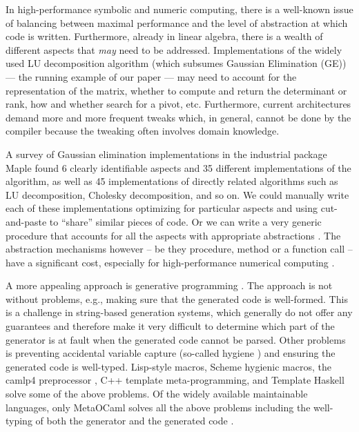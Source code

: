 \documentclass[draft]{elsart}
\begin{document}
In high-performance symbolic and numeric computing, there is a
well-known issue of balancing between maximal performance and the
level of abstraction at which code is written.  Furthermore, already
in linear algebra, there is a wealth of different aspects that
\emph{may} need to be addressed. Implementations of the
widely used LU decomposition algorithm (which subsumes Gaussian 
Elimination (GE)) --- the running
example of our paper --- may need to account for the representation of
the matrix, whether to compute and return the determinant or rank, how
and whether search for a pivot, etc. Furthermore, current architectures
demand more and more frequent tweaks which, in general, cannot be done by the
compiler because the tweaking often involves domain knowledge. 

A survey \cite{Carette06} of
Gaussian elimination implementations in the industrial package Maple
found 6 clearly identifiable aspects and 35 different implementations of the
algorithm, as well as 45 implementations of directly related algorithms such as
LU decomposition, Cholesky decomposition, and so on.  We could
manually write each of these implementations optimizing for particular aspects
and using cut-and-paste to ``share'' similar pieces of code.
Or we can write a very generic procedure that accounts for
all the aspects with appropriate abstractions \cite{Axiom}. The
abstraction mechanisms however -- be they procedure, method or a
function call -- have a significant cost, especially for
high-performance numerical computing \cite{Carette06}. 

A more appealing approach is generative programming
\cite{Czarnecki,Veldhuizen:1998:ISCOPE,musser89generic,musser94algorithmoriented,BOOST,POOMA,ATLAS}.
The approach is not without problems, e.g., making sure that the
generated code is well-formed. This is a challenge in string-based
generation systems, which generally do not offer any guarantees and
therefore make it very difficult to determine which part of the
generator is at fault when the generated code cannot be parsed. Other
problems is preventing accidental variable capture (so-called hygiene
\cite{HygienicMacros}) and ensuring the generated code is
well-typed. Lisp-style macros, Scheme hygienic macros, the camlp4
preprocessor \cite{camlp4}, C++ template meta-programming, and Template
Haskell \cite{conf/dagstuhl/CzarneckiOST03} solve some of the above
problems. Of the widely available maintainable languages, only
MetaOCaml \cite{CTHL03,metaocaml-org}  solves all the above problems
including the well-typing of both the generator and 
the generated code \cite{TahaSheard97,TahaThesis}.
\end{document}
